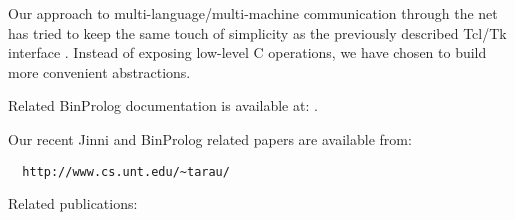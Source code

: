 \documentclass{article}
\begin{document}

Our approach to multi-language/multi-machine communication 
through the net has tried to keep the same touch of simplicity
as the previously described Tcl/Tk interface \cite{TD94:WE}.
Instead of exposing low-level C operations, we have chosen
to build more convenient abstractions.

Related BinProlog documentation is available at: 
\cite{bp7user,bp7advanced,bp7interface,bp7crossref}.

Our recent Jinni and BinProlog related papers are available
from:

\begin{verbatim}
  http://www.cs.unt.edu/~tarau/
\end{verbatim}

Related publications: \cite{T98:Jinni,ilps97tut,tdb95rev,TD94:WE}
 
\end{document}
